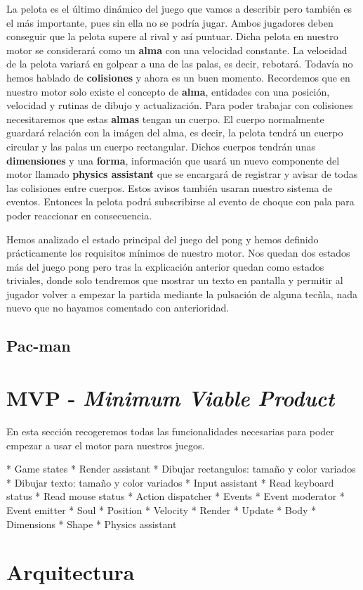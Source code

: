 \documentclass[a4paper]{article}
\begin{document}
La pelota es el último dinámico del juego que vamos a describir pero también es el más importante, pues sin ella no se podría jugar. Ambos jugadores deben conseguir que la pelota supere al rival y así puntuar. Dicha pelota en nuestro motor se considerará como un \textbf{alma} con una velocidad constante. La velocidad de la pelota variará en golpear a una de las palas, es decir, rebotará. Todavía no hemos hablado de \textbf{colisiones} y ahora es un buen momento. Recordemos que en nuestro motor solo existe el concepto de \textbf{alma}, entidades con una posición, velocidad y rutinas de dibujo y actualización. Para poder trabajar con colisiones necesitaremos que estas \textbf{almas} tengan un cuerpo. El cuerpo normalmente guardará relación con la imágen del alma, es decir, la pelota tendrá un cuerpo circular y las palas un cuerpo rectangular. Dichos cuerpos tendrán unas \textbf{dimensiones} y una \textbf{forma}, información que usará un nuevo componente del motor llamado \textbf{physics assistant} que se encargará de registrar y avisar de todas las colisiones entre cuerpos. Estos avisos también usaran nuestro sistema de eventos. Entonces la pelota podrá subscribirse al evento de choque con pala para poder reaccionar en consecuencia.

Hemos analizado el estado principal del juego del pong y hemos definido prácticamente los requisitos mínimos de nuestro motor. Nos quedan dos estados más del juego pong pero tras la explicación anterior quedan como estados triviales, donde solo tendremos que mostrar un texto en pantalla y permitir al jugador volver a empezar la partida mediante la pulsación de alguna tecñla, nada nuevo que no hayamos comentado con anterioridad.

\subsection{Pac-man}

\section{MVP - \textit{Minimum Viable Product}}

En esta sección recogeremos todas las funcionalidades necesarias para poder empezar a usar el motor para nuestros juegos. 

* Game states
* Render assistant
  * Dibujar rectangulos: tamaño y color variados
  * Dibujar texto: tamaño y color variados
* Input assistant
  * Read keyboard status
  * Read mouse status
* Action dispatcher
* Events
  * Event moderator
  * Event emitter
* Soul
  * Position
  * Velocity
  * Render
  * Update
* Body
  * Dimensions
  * Shape
* Physics assistant

\section{Arquitectura}
\end{document}
